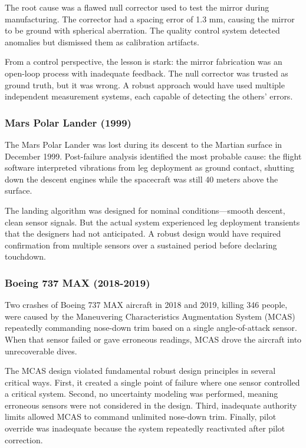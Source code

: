 The root cause was a flawed null corrector used to test the mirror during manufacturing. The corrector had a spacing error of 1.3 mm, causing the mirror to be ground with spherical aberration. The quality control system detected anomalies but dismissed them as calibration artifacts.

From a control perspective, the lesson is stark: the mirror fabrication was an open-loop process with inadequate feedback. The null corrector was trusted as ground truth, but it was wrong. A robust approach would have used multiple independent measurement systems, each capable of detecting the others' errors.

\subsubsection{Mars Polar Lander (1999)}

The Mars Polar Lander was lost during its descent to the Martian surface in December 1999. Post-failure analysis identified the most probable cause: the flight software interpreted vibrations from leg deployment as ground contact, shutting down the descent engines while the spacecraft was still 40 meters above the surface.

The landing algorithm was designed for nominal conditions---smooth descent, clean sensor signals. But the actual system experienced leg deployment transients that the designers had not anticipated. A robust design would have required confirmation from multiple sensors over a sustained period before declaring touchdown.

\subsubsection{Boeing 737 MAX (2018-2019)}

Two crashes of Boeing 737 MAX aircraft in 2018 and 2019, killing 346 people, were caused by the Maneuvering Characteristics Augmentation System (MCAS) repeatedly commanding nose-down trim based on a single angle-of-attack sensor. When that sensor failed or gave erroneous readings, MCAS drove the aircraft into unrecoverable dives.

The MCAS design violated fundamental robust design principles in several critical ways. First, it created a single point of failure where one sensor controlled a critical system. Second, no uncertainty modeling was performed, meaning erroneous sensors were not considered in the design. Third, inadequate authority limits allowed MCAS to command unlimited nose-down trim. Finally, pilot override was inadequate because the system repeatedly reactivated after pilot correction.

